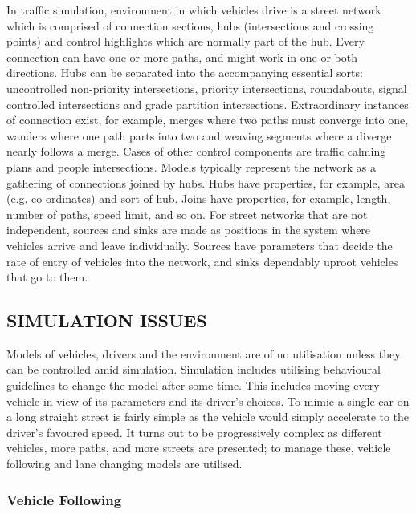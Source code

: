 \documentclass[11pt,a4paper]{article}
\begin{document}
In traffic simulation, environment in which vehicles drive is a street network which is comprised of connection sections, hubs (intersections and crossing points) and control highlights which are normally part of the hub. Every connection can have one or more paths, and might work in one or both directions. Hubs can be separated into the accompanying essential sorts: uncontrolled non-priority intersections, priority intersections, roundabouts, signal controlled intersections and grade partition intersections. Extraordinary instances of connection exist, for example, merges where two paths must converge into one, wanders where one path parts into two and weaving segments where a diverge nearly follows a merge. Cases of other control components are traffic calming plans and people intersections.\newline 
Models typically represent the network as a gathering of connections joined by hubs. Hubs have properties, for example, area (e.g. co-ordinates) and sort of hub. Joins have properties, for example, length, number of paths, speed limit, and so on. For street networks that are not independent, sources and sinks are made as positions in the system where vehicles arrive and leave individually. Sources have parameters that decide the rate of entry of vehicles into the network, and sinks dependably uproot vehicles that go to them.



\subsection{SIMULATION ISSUES}

Models of vehicles, drivers and the environment are of no utilisation unless they can be controlled amid simulation. Simulation includes utilising behavioural guidelines to change the model after some time. This includes moving every vehicle in view of its parameters and its driver's choices. To mimic a single car on a long straight street is fairly simple as the vehicle would simply accelerate to the driver's favoured speed. It turns out to be progressively complex as different vehicles, more paths, and more streets are presented; to manage these, vehicle following and lane changing models are utilised.

\subsubsection{\textbf{Vehicle Following}}
\end{document}
